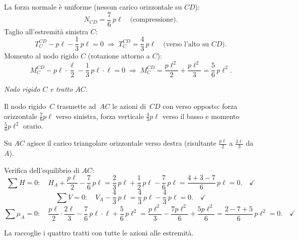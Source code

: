 La forza normale è uniforme (nessun carico orizzontale su $CD$):
\[
N_{CD} = \frac{7}{6}\,p\ell \quad\text{(compressione).}
\]
Taglio all'estremità sinistra $C$:
\[
T_C^{CD} - p\ell - \frac{1}{3}\,p\ell = 0
\;\Rightarrow\;
T_C^{CD} = \frac{4}{3}\,p\ell
\quad\text{(verso l'alto su }CD\text{).}
\]
Momento al nodo rigido $C$ (rotazione attorno a $C$):
\[
M_C^{CD} - p\ell\cdot\frac{\ell}{2} - \frac{1}{3}\,p\ell\cdot\ell = 0
\;\Rightarrow\;
M_C^{CD} = \frac{p\ell^2}{2} + \frac{p\ell^2}{3}
= \frac{5}{6}\,p\ell^2.
\]

\medskip
\noindent\textit{Nodo rigido $C$ e tratto $AC$.}

Il nodo rigido~$C$ trasmette ad~$AC$ le azioni di~$CD$ con verso
opposto: forza orizzontale $\tfrac{7}{6}p\ell$ verso sinistra,
forza verticale $\tfrac{4}{3}p\ell$ verso il basso
e momento $\tfrac{5}{6}p\ell^2$ orario.

Su $AC$ agisce il carico triangolare orizzontale verso destra
(risultante $\tfrac{p\ell}{2}$ a $\tfrac{2\ell}{3}$ da~$A$).

\noindent Verifica dell'equilibrio di $AC$:
\[
\sum H = 0:\quad
H_A + \frac{p\ell}{2} - \frac{7}{6}\,p\ell
= \frac{2}{3}\,p\ell + \frac{1}{2}\,p\ell - \frac{7}{6}\,p\ell
= \frac{4+3-7}{6}\,p\ell = 0.\quad\checkmark
\]
\[
\sum V = 0:\quad
V_A - \frac{4}{3}\,p\ell
= \frac{4}{3}\,p\ell - \frac{4}{3}\,p\ell = 0.\quad\checkmark
\]
\[
\sum \mu_A = 0:\quad
\frac{p\ell}{2}\cdot\frac{2\ell}{3}
- \frac{7}{6}\,p\ell\cdot\ell
+ \frac{5}{6}\,p\ell^2
= \frac{p\ell^2}{3} - \frac{7p\ell^2}{6} + \frac{5p\ell^2}{6}
= \frac{2-7+5}{6}\,p\ell^2 = 0.\quad\checkmark
\]

La  raccoglie i quattro tratti con
tutte le azioni alle estremità.

